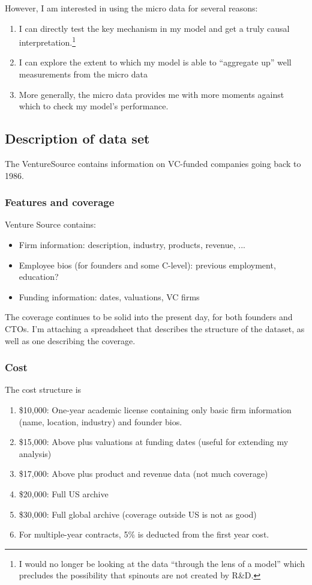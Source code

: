\documentclass[12pt,english]{article}
\theoremstyle{remark}
\begin{document}
However, I am interested in using the micro data for several reasons:
\begin{enumerate}
	\item I can directly test the key mechanism in my model and get a truly causal interpretation.\footnote{I would no longer be looking at the data ``through the lens of a model'' which precludes the possibility that spinouts are not created by R\&D.}
	\item I can explore the extent to which my model is able to ``aggregate up'' well measurements from the micro data
	\item More generally, the micro data provides me with more moments against which to check my model's performance.
\end{enumerate}

\subsection{Description of data set}

The VentureSource contains information on VC-funded companies going back to 1986. 

\subsubsection{Features and coverage}

Venture Source contains:
\begin{itemize}
	\item Firm information: description, industry, products, revenue, ...
	\item Employee bios (for founders and some C-level): previous employment, education?
	\item Funding information: dates, valuations, VC firms
\end{itemize}

The coverage continues to be solid into the present day, for both founders and CTOs. I'm attaching a spreadsheet that describes the structure of the dataset, as well as one describing the coverage.

\subsubsection{Cost}

The cost structure is
\begin{enumerate}
	\item \$10,000: One-year academic license containing only basic firm information (name, location, industry) and founder bios.
	\item \$15,000: Above plus valuations at funding dates (useful for extending my analysis)
	\item \$17,000: Above plus product and revenue data (not much coverage)
	\item \$20,000: Full US archive
	\item \$30,000: Full global archive (coverage outside US is not as good)
	\item For multiple-year contracts, 5\% is deducted from the first year cost.
\end{enumerate}
\end{document}
